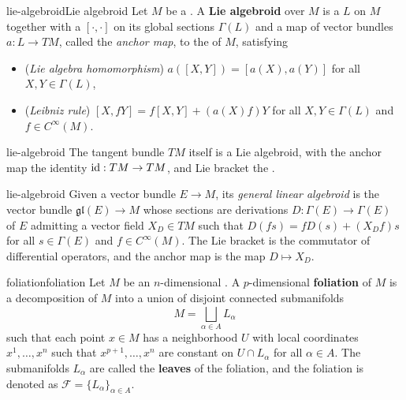 \begin{topic}{lie-algebroid}{Lie algebroid}
    Let $M$ be a . A \textbf{Lie algebroid} over $M$ is a  $L$ on $M$ together with a  $[\cdot, \cdot]$ on its global sections $\Gamma(L)$ and a map of vector bundles $a : L \to TM$, called the \textit{anchor map}, to the  of $M$, satisfying
    \begin{itemize}
        \item (\textit{Lie algebra homomorphism}) $a([X, Y]) = [a(X), a(Y)]$ for all $X, Y \in \Gamma(L)$,
        \item (\textit{Leibniz rule}) $[X, fY] = f[X, Y] + (a(X)  f) Y$ for all $X, Y \in \Gamma(L)$ and $f \in C^\infty(M)$.
    \end{itemize}
\end{topic}

\begin{example}{lie-algebroid}
    The tangent bundle $TM$ itself is a Lie algebroid, with the anchor map the identity $\text{id} : TM \to TM$, and Lie bracket the .
\end{example}

\begin{example}{lie-algebroid}
    Given a vector bundle $E \to M$, its \textit{general linear algebroid} is the vector bundle $\mathfrak{gl}(E) \to M$ whose sections are derivations $D : \Gamma(E) \to \Gamma(E)$ of $E$ admitting a vector field $X_D \in TM$ such that $D(f s) = f D(s) + (X_D f) s$ for all $s \in \Gamma(E)$ and $f \in C^\infty(M)$. The Lie bracket is the commutator of differential operators, and the anchor map is the map $D \mapsto X_D$.
\end{example}

\begin{topic}{foliation}{foliation}
    Let $M$ be an $n$-dimensional . A $p$-dimensional \textbf{foliation} of $M$ is a decomposition of $M$ into a union of disjoint connected submanifolds
    \[ M = \bigsqcup_{\alpha \in A} L_\alpha \]
    such that each point $x \in M$ has a neighborhood $U$ with local coordinates $x^1, \ldots, x^n$ such that $x^{p + 1}, \ldots, x^n$ are constant on $U \cap L_\alpha$ for all $\alpha \in A$. The submanifolds $L_\alpha$ are called the \textbf{leaves} of the foliation, and the foliation is denoted as $\mathcal{F} = \{ L_\alpha \}_{\alpha \in A}$.
\end{topic}


